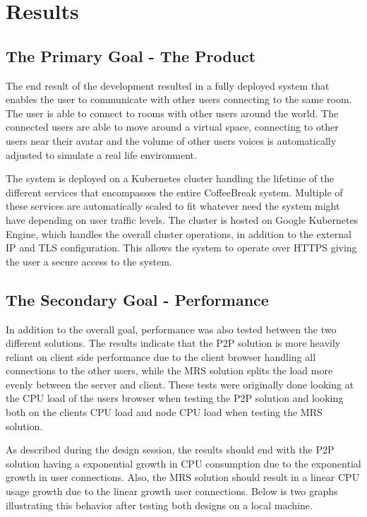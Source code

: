 \chapter{Results}\label{chap:results}
\section{The Primary Goal - The Product}
The end result of the development resulted in a fully deployed system that enables the user to communicate with other users connecting to the same room. The user is able to connect to rooms with other users around the world. The connected users are able to move around a virtual space, connecting to other users near their avatar and the volume of other users voices is automatically adjusted to simulate a real life environment.

The system is deployed on a Kubernetes cluster handling the lifetime of the different services that encompasses the entire CoffeeBreak system. Multiple of these services are automatically scaled to fit whatever need the system might have depending on user traffic levels. The cluster is hosted on Google Kubernetes Engine, which handles the overall cluster operations, in addition to the external IP and TLS configuration. This allows the system to operate over HTTPS giving the user a secure access to the system. 

\section{The Secondary Goal - Performance}
In addition to the overall goal, performance was also tested between the two different solutions. The results indicate that the P2P solution is more heavily reliant on client side performance due to the client browser handling all connections to the other users, while the MRS solution splits the load more evenly between the server and client. These tests were originally done looking at the CPU load of the users browser when testing the P2P solution and looking both on the clients CPU load and node CPU load when testing the MRS solution. 

As described during the design session, the results should end with the P2P solution having a exponential growth in CPU consumption due to the exponential growth in user connections. Also, the MRS solution should result in a linear CPU usage growth due to the linear growth user connections. Below is two graphs illustrating this behavior after testing both designs on a local machine.

